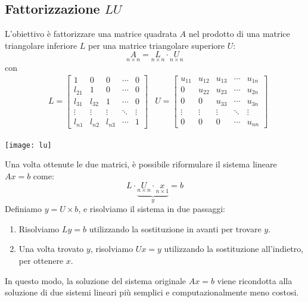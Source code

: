 \documentclass{article}
\begin{document}
\subsection{Fattorizzazione $LU$}
L'obiettivo è fattorizzare una matrice quadrata $A$ nel prodotto di una
matrice triangolare inferiore $L$ per una matrice triangolare superiore $U$:
$$\underset{n\times n}A=\underset{n\times n}L\cdot\underset{n\times n}U$$
con 
\begin{equation*}
   \begin{aligned}
       & L = \begin{bmatrix}
           1 & 0 & 0 & \cdots & 0 \\
           l_{21} & 1 & 0 & \cdots & 0 \\
           l_{31} & l_{32} & 1 & \cdots & 0 \\
           \vdots & \vdots & \vdots & \ddots & \vdots \\
           l_{n1} & l_{n2} & l_{n3} & \cdots & 1
           \end{bmatrix} &
           U = \begin{bmatrix}
           u_{11} & u_{12} & u_{13} & \cdots & u_{1n} \\
           0 & u_{22} & u_{23} & \cdots & u_{2n} \\
           0 & 0 & u_{33} & \cdots & u_{3n} \\
           \vdots & \vdots & \vdots & \ddots & \vdots \\
           0 & 0 & 0 & \cdots & u_{nn}
       \end{bmatrix}
   \end{aligned}
\end{equation*}
\begin{center}
    \texttt{[image: lu]}
\end{center}
Una volta ottenute le due matrici, è possibile riformulare il sistema lineare
$Ax=b$ come:
$$L\cdot\underbrace{\underset{n\times n}U\cdot\underset{n\times1}x}_{y}=b$$
Definiamo $y=U\times b$, e risolviamo il sistema in due passaggi:
\begin{enumerate}
    \item Risolviamo $Ly=b$ utilizzando la sostituzione in avanti per trovare $y$.
    \item Una volta trovato $y$, risolviamo $Ux=y$ utilizzando la sostituzione
        all'indietro, per ottenere $x$.
\end{enumerate}
In questo modo, la soluzione del sistema originale $Ax=b$ viene ricondotta
alla soluzione di due sistemi lineari più semplici e computazionalmente meno
costosi.
\end{document}
